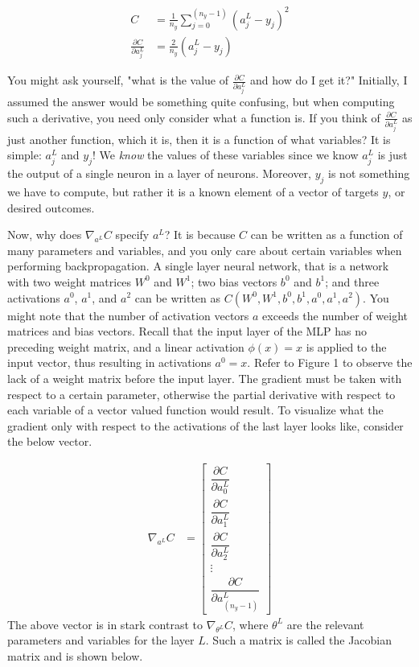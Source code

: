 \documentclass{article}
\begin{document}
\begin{align}
	C                                     & = \frac{1}{n_y} \sum_{j=0}^{(n_y - 1)} { (a_{j}^{L} - y_j)^{2} } \\
	\frac{\partial C}{\partial a_{j}^{L}} & = \frac{2}{n_y} (a_{j}^{L} - y_j)
\end{align}

You might ask yourself, "what is the value of
$\frac{\partial C}{\partial a_{j}^{L}}$ and how do I get it?" Initially, I assumed the answer would
be something quite confusing, but when computing such a derivative, you need
only consider what a function is. If you think of $\frac{\partial C}{\partial a_{j}^{L}}$
as just another function, which it is, then it is a function of what variables?
It is simple: $a_{j}^{L}$ and $y_j$! We \textit{know} the values of these variables
since we know $a_{j}^{L}$ is just the output of a single neuron in a layer
of neurons. Moreover, $y_j$ is not something we have to compute, but rather it
is a known element of a vector of targets $y$, or desired outcomes.

Now, why does $\nabla_{a^{L}} C$ specify $a^{L}$? It is because $C$ can be written as
a function of many parameters and variables, and you only care about certain variables
when performing backpropagation. A single layer neural network,
that is a network with two weight matrices $W^{0}$ and $W^{1}$; two bias vectors
$b^{0}$ and $b^{1}$; and three activations $a^{0}$, $a^{1}$, and $a^{2}$
can be written as $C(W^{0}, W^{1}, b^{0}, b^{1}, a^{0}, a^{1}, a^{2})$. You might
note that the number of activation vectors $a$ exceeds the number of weight matrices
and bias vectors. Recall that the input layer of the MLP has no preceding
weight matrix, and a linear activation $\phi(x) = x$ is applied to the input vector,
thus resulting in activations $a^{0} = x$. Refer to Figure 1 to observe the lack
of a weight matrix before the input layer. The gradient must be taken with respect to a
certain parameter, otherwise the partial derivative with respect
to each variable of a vector valued function would result. To visualize what the gradient
only with respect to the activations of the last layer looks like, consider the below vector.

\begin{align}
	\nabla_{a^{L}} C & =
	\begin{bmatrix}
		\dfrac{\partial C}{\partial a_{0}^{L}} \\
		\dfrac{\partial C}{\partial a_{1}^{L}} \\
		\dfrac{\partial C}{\partial a_{2}^{L}} \\
		\vdots                                 \\
		\dfrac{\partial C}{\partial a_{(n_{y} - 1)}^{L}}
	\end{bmatrix}
\end{align}
The above vector is in stark contrast to $\nabla_{\theta^{L}} C$, where
$\theta^{L}$ are the relevant parameters and variables for the layer $L$.
Such a matrix is called the Jacobian matrix and is shown below.
\end{document}
